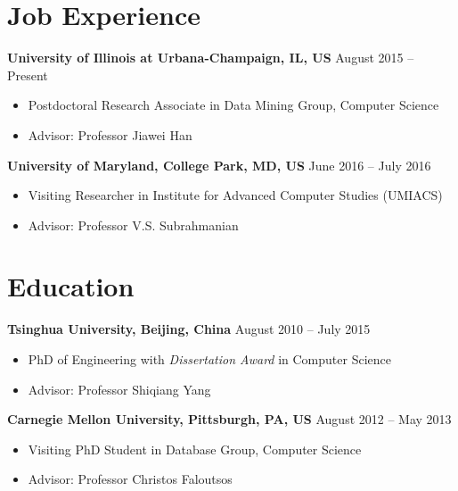 \documentclass[margin, 10pt]{res}
\begin{document}
\begin{resume}

\section{Job Experience}

\textbf{University of Illinois at Urbana-Champaign, IL, US} \hfill{August 2015 -- Present}
\begin{itemize} \itemsep -2pt
	\item Postdoctoral Research Associate in Data Mining Group, Computer Science
	\item Advisor: Professor Jiawei Han
\end{itemize}

\textbf{University of Maryland, College Park, MD, US} \hfill{June 2016 -- July 2016}
\begin{itemize} \itemsep -2pt
	\item Visiting Researcher in Institute for Advanced Computer Studies (UMIACS)
	\item Advisor: Professor V.S. Subrahmanian
\end{itemize}


\section{Education}

\textbf{Tsinghua University, Beijing, China} \hfill{August 2010 -- July 2015}
\begin{itemize} \itemsep -2pt
\item PhD of Engineering with \textit{Dissertation Award} in Computer Science
\item Advisor: Professor Shiqiang Yang
\end{itemize}

\textbf{Carnegie Mellon University, Pittsburgh, PA, US} \hfill{August 2012 -- May 2013}
\begin{itemize} \itemsep -2pt
\item Visiting PhD Student in Database Group, Computer Science
\item Advisor: Professor Christos Faloutsos
\end{itemize}


\end{resume}
\end{document}
